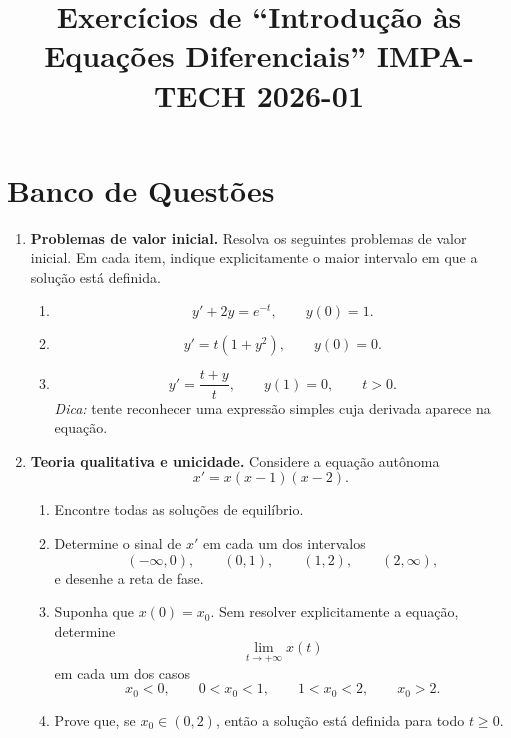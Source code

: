 \documentclass[a4paper,11pt,reqno]{amsart}
\title{Exercícios de ``Introdução às Equações Diferenciais''  IMPA-TECH 2026-01}
\begin{document}
\maketitle

\section*{Banco de Questões}

\begin{enumerate}

\item \textbf{Problemas de valor inicial.}
Resolva os seguintes problemas de valor inicial. Em cada item, indique explicitamente o maior intervalo em que a solução está definida.

\begin{enumerate}
    \item 
    \[
        y' + 2y = e^{-t}, \qquad y(0)=1.
    \]

    \item 
    \[
        y' = t(1+y^2), \qquad y(0)=0.
    \]

    \item 
    \[
        y' = \frac{t+y}{t}, \qquad y(1)=0, \qquad t>0.
    \]
    \emph{Dica:} tente reconhecer uma expressão simples cuja derivada aparece na equação.
\end{enumerate}


\item \textbf{Teoria qualitativa e unicidade.}
Considere a equação autônoma
\[
    x' = x(x-1)(x-2).
\]

\begin{enumerate}
    \item Encontre todas as soluções de equilíbrio.

    \item Determine o sinal de $x'$ em cada um dos intervalos
    \[
        (-\infty,0), \qquad (0,1), \qquad (1,2), \qquad (2,\infty),
    \]
    e desenhe a reta de fase.

    \item Suponha que $x(0)=x_0$. Sem resolver explicitamente a equação, determine
    \[
        \lim_{t\to +\infty} x(t)
    \]
    em cada um dos casos
    \[
        x_0<0, \qquad 0<x_0<1, \qquad 1<x_0<2, \qquad x_0>2.
    \]

    \item Prove que, se $x_0\in(0,2)$, então a solução está definida para todo $t\geq 0$.
\end{enumerate}



\end{enumerate}
\end{document}
